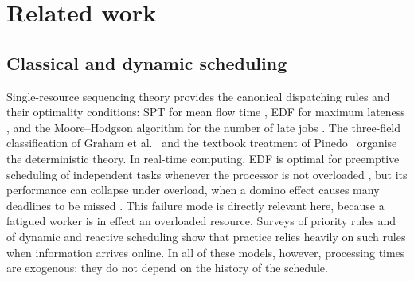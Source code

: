 \section{Related work}\label{sec:related}

\subsection{Classical and dynamic scheduling}
Single-resource sequencing theory provides the canonical dispatching rules and their optimality conditions: SPT for mean flow time \cite{smith1956}, EDF for maximum lateness \cite{jackson1955}, and the Moore--Hodgson algorithm for the number of late jobs \cite{moore1968}. The three-field classification of Graham et al.~\cite{graham1979} and the textbook treatment of Pinedo~\cite{pinedo2016} organise the deterministic theory. In real-time computing, EDF is optimal for preemptive scheduling of independent tasks whenever the processor is not overloaded \cite{liu1973}, but its performance can collapse under overload, when a domino effect causes many deadlines to be missed \cite{buttazzo2011}. This failure mode is directly relevant here, because a fatigued worker is in effect an overloaded resource. Surveys of priority rules \cite{panwalkar1977,haupt1989} and of dynamic and reactive scheduling \cite{vieira2003,ouelhadj2009} show that practice relies heavily on such rules when information arrives online. In all of these models, however, processing times are exogenous: they do not depend on the history of the schedule.

